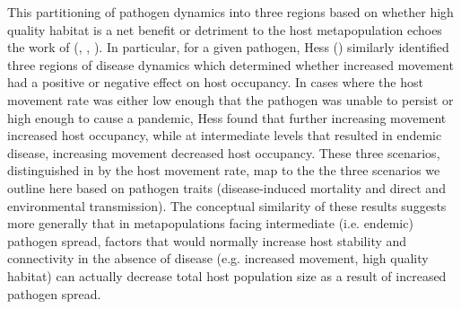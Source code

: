 \documentclass{article}
\begin{document}
This partitioning of pathogen dynamics into three regions based on whether high quality habitat is a net benefit or detriment to the host metapopulation echoes the work of (\cite{Hess1996}, \cite{Gog2002}, \cite{Park2012}).
In particular, for a given pathogen, Hess (\cite{Hess1996}) similarly identified three regions of disease dynamics which determined whether increased movement had a positive or negative effect on host occupancy.  
In cases where the host movement rate was either low enough that the pathogen was unable to persist or high enough to cause a pandemic, Hess found that further increasing movement increased host occupancy, while at intermediate levels that resulted in endemic disease, increasing movement decreased host occupancy.
These three scenarios, distinguished in \cite{Hess1996} by the host movement rate, map to the the three scenarios we outline here based on pathogen traits (disease-induced mortality and direct and environmental transmission).
The conceptual similarity of these results suggests more generally that in metapopulations facing intermediate (i.e. endemic) pathogen spread, factors that would normally increase host stability and connectivity in the absence of disease (e.g. increased movement, high quality habitat) can actually decrease total host population size as a result of increased pathogen spread.
\end{document}
